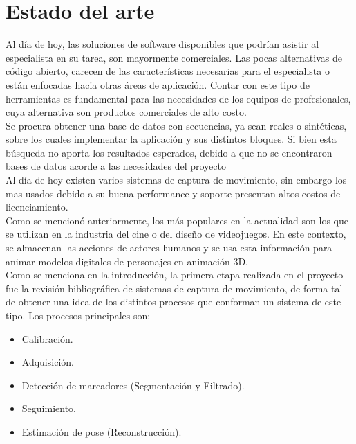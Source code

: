\section{Estado del arte}\label{estadoDelArte}


Al  día  de  hoy, las  soluciones  de  software  disponibles que  podrían  asistir al especialista en su tarea, son mayormente comerciales. Las pocas alternativas de código abierto, carecen de las características necesarias para el especialista o están enfocadas hacia otras áreas de aplicación. Contar con este tipo de herramientas es fundamental para las necesidades de los equipos de profesionales, cuya alternativa son productos comerciales de alto costo.\\


Se procura obtener una base de datos con secuencias, ya sean reales o sintéticas, sobre los cuales implementar la aplicación y sus distintos bloques. Si bien esta búsqueda no aporta los resultados esperados,
 debido a que no se encontraron bases de datos acorde a las necesidades del proyecto\\
 
 Al día de hoy existen varios sistemas de captura de movimiento, sin embargo los mas usados debido a su buena performance y soporte presentan altos costos de licenciamiento. 
\\ 

Como se mencionó anteriormente, los más populares en la actualidad son los que se utilizan en la industria del cine o del diseño de videojuegos. En este contexto, se almacenan las acciones de actores humanos y se usa esta información para animar modelos digitales de personajes en animación 3D.
\\ 



Como se menciona en la introducción, la primera etapa realizada en el proyecto fue la revisión bibliográfica de sistemas de captura de movimiento, de forma tal de obtener una idea de los distintos procesos que conforman un sistema de este tipo. Los procesos principales son:

\begin{itemize}
	\item Calibración.
	\item Adquisición.
	\item Detección de marcadores (Segmentación y Filtrado).
	\item Seguimiento.
	\item Estimación de pose (Reconstrucción).
\end{itemize}

